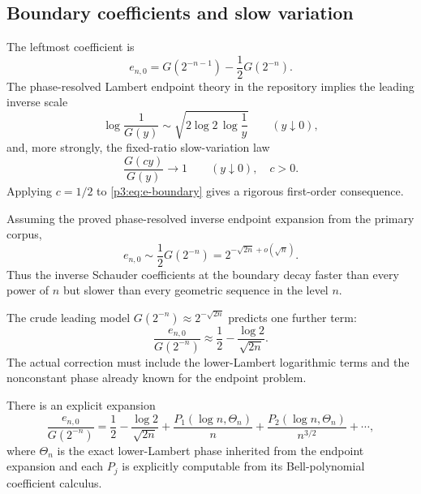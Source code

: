 \documentclass[11pt]{article}
\theoremstyle{definition}
\theoremstyle{remark}
\begin{document}
\subsection{Boundary coefficients and slow variation}

The leftmost coefficient is
\begin{equation}\label{p3:eq:e-boundary}
 e_{n,0}=G(2^{-n-1})-\frac12G(2^{-n}).
\end{equation}
The phase-resolved Lambert endpoint theory in the repository implies the
leading inverse scale
\begin{equation}\label{p3:eq:G-leading-log}
 \log\frac1{G(y)}
 \sim\sqrt{2\log2\,\log\frac1y}
 \qquad(y\downarrow0),
\end{equation}
and, more strongly, the fixed-ratio slow-variation law
\begin{equation}\label{p3:eq:G-slow-variation}
 \frac{G(cy)}{G(y)}\longrightarrow1
 \qquad(y\downarrow0),\quad c>0.
\end{equation}
Applying $c=1/2$ to \eqref{p3:eq:e-boundary} gives a rigorous first-order
consequence.

\begin{proposition}
\label{p3:prop:boundary-Schauder}
Assuming the proved phase-resolved inverse endpoint expansion from the primary
corpus,
\begin{equation}\label{p3:eq:e-boundary-asymptotic}
 e_{n,0}\sim\frac12G(2^{-n})
 =2^{-\sqrt{2n}+o(\sqrt n)}.
\end{equation}
Thus the inverse Schauder coefficients at the boundary decay faster than every
power of $n$ but slower than every geometric sequence in the level $n$.
\end{proposition}

The crude leading model $G(2^{-n})\approx2^{-\sqrt{2n}}$ predicts one further
term:
\begin{equation}\label{p3:eq:e-boundary-model}
 \frac{e_{n,0}}{G(2^{-n})}
 \approx\frac12-\frac{\log2}{\sqrt{2n}}.
\end{equation}
The actual correction must include the lower-Lambert logarithmic terms and the
nonconstant phase already known for the endpoint problem.

\begin{conjecture}
\label{p3:conj:inverse-boundary-phase}
There is an explicit expansion
\begin{equation}\label{p3:eq:e-boundary-phase-conj}
 \frac{e_{n,0}}{G(2^{-n})}
 =\frac12-\frac{\log2}{\sqrt{2n}}
  +\frac{P_1(\log n,\Theta_n)}{n}
  +\frac{P_2(\log n,\Theta_n)}{n^{3/2}}+\cdots,
\end{equation}
where $\Theta_n$ is the exact lower-Lambert phase inherited from the endpoint
expansion and each $P_j$ is explicitly computable from its Bell-polynomial
coefficient calculus.
\end{conjecture}
\end{document}
